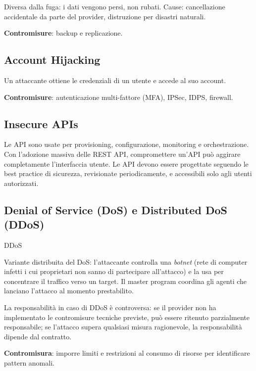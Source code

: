 \documentclass[
  italian,
  openany]{book}
\begin{document}
Diversa dalla fuga: i dati vengono persi, non rubati. Cause:
cancellazione accidentale da parte del provider, distruzione per
disastri naturali.

\textbf{Contromisure}: backup e replicazione.

\subsection{Account Hijacking}\label{account-hijacking}

Un attaccante ottiene le credenziali di un utente e accede al suo
account.

\textbf{Contromisure}: autenticazione multi-fattore (MFA), IPSec, IDPS,
firewall.

\subsection{Insecure APIs}\label{insecure-apis}

Le API sono usate per provisioning, configurazione, monitoring e
orchestrazione. Con l'adozione massiva delle REST API, compromettere
un'API può aggirare completamente l'interfaccia utente. Le API devono
essere progettate seguendo le best practice di sicurezza, revisionate
periodicamente, e accessibili solo agli utenti autorizzati.

\subsection{Denial of Service (DoS) e Distributed DoS
(DDoS)}\label{denial-of-service-dos-e-distributed-dos-ddos}

\begin{calloutdefinition}{DDoS}

Variante distribuita del DoS: l'attaccante controlla una \emph{botnet}
(rete di computer infetti i cui proprietari non sanno di partecipare
all'attacco) e la usa per concentrare il traffico verso un target. Il
master program coordina gli agenti che lanciano l'attacco al momento
prestabilito.

\end{calloutdefinition}

La responsabilità in caso di DDoS è controversa: se il provider non ha
implementato le contromisure tecniche previste, può essere ritenuto
parzialmente responsabile; se l'attacco supera qualsiasi misura
ragionevole, la responsabilità dipende dal contratto.

\textbf{Contromisura}: imporre limiti e restrizioni al consumo di
risorse per identificare pattern anomali.
\end{document}
